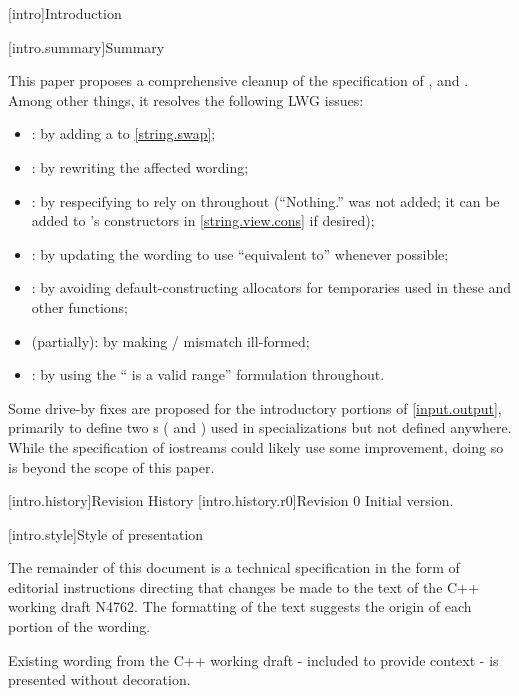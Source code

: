 [intro]{Introduction}

[intro.summary]{Summary}

\pnum
This paper proposes a comprehensive cleanup of the specification of 
,  and .
Among other things, it resolves the following LWG issues:
\begin{itemize}
\item {}: by adding a \expects to \ref{string.swap};
\item {}: by rewriting the affected wording;
\item {}: by respecifying to rely on  throughout (``\throws Nothing.'' was not added;
it can be added to 's constructors in \ref{string.view.cons} if desired);
\item {}: by updating the wording to use ``equivalent to'' whenever possible;
\item {}: by avoiding default-constructing allocators for temporaries used in these and other functions;
\item {} (partially): by making / mismatch ill-formed;
\item {}: by using the `` is a valid range'' formulation throughout.
\end{itemize}

\pnum
Some drive-by fixes are proposed for the introductory portions of \ref{input.output},
primarily to define two s 
( and )
used in  specializations but not defined anywhere. 
While the specification of iostreams could likely use some improvement,
doing so is beyond the scope of this paper.

[intro.history]{Revision History}
[intro.history.r0]{Revision 0}
Initial version.

[intro.style]{Style of presentation}

\pnum
The remainder of this document is a technical specification in the form of
editorial instructions directing that changes be made to the text of the C++
working draft N4762. The formatting of the text suggests the origin of each 
portion of the wording.

Existing wording from the C++ working draft - included to provide context - is
presented without decoration.


